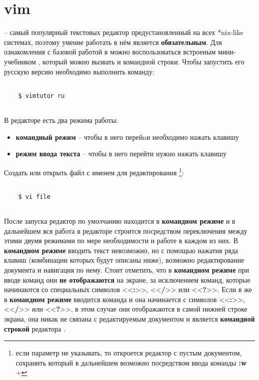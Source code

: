 \section{vim}

\noindent
{} -- самый популярный текстовых редактор предустановленный на всех *nix-like системах, поэтому умение работать в нём является \textbf{обязательным}. Для ознакомления с базовой работой в  можно воспользоваться встроеным мини-учебником , который можно вызвать и командной строки. Чтобы запустить его русскую версию необходимо выполнить команду:

\begin{lstlisting}
	
	$ vimtutor ru
	
\end{lstlisting}	

В редакторе  есть два режима работы:
\begin{itemize}
	\item \textbf{командный режим} -- чтобы в него перейnи необходимо нажать клавишу 
	\item \textbf{режим ввода текста} -- чтобы в него перейти нужно нажать клавишу 
\end{itemize}


\noindent
Создать или открыть файл с именем  для редактирования \footnote{если параметр  не указывать, то откроется редактор с пустым документом, сохранить который в дальнейшем возможно посредством ввода команды \textbf{:w}  + }:

\begin{lstlisting}
	
	$ vi file
	
\end{lstlisting}	

После запуска  редактор по умолчанию находится в \textbf{командном режиме} и в дальнейшем вся работа в редакторе строится посредством переключения между этими двумя режимами по мере необходимости и работе в каждом из них. В \textbf{командном режиме} вводить текст невозможно, но с помощью нажатия ряда клавиш (комбинации которых будут описаны ниже), возможно редактирование документа и навигация по нему. Стоит отметить, что в \textbf{командном режиме} при вводе команд они \textbf{не отображаются} на экране, за исключением команд, которые начинаются со специальных символов <<\textbf{:}>>, <<\textbf{/}>> или <<\textbf{?}>>. Если в же в \textbf{командном режиме} вводится команда и она начинается с символов <<\textbf{:}>>, <<\textbf{/}>> или <<\textbf{?}>>, в этом случае они отображаются в самой нижней строке экрана, она никак не связана с редактируемым документом и является \textbf{командной строкой} редактора . 

